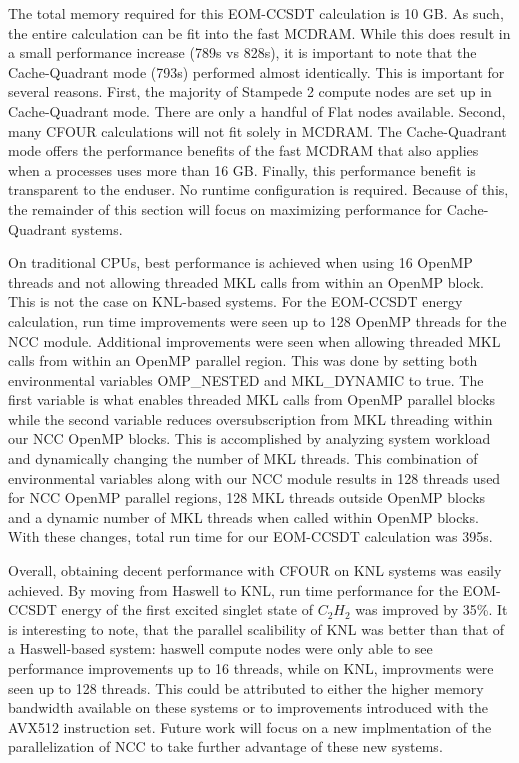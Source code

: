 The total memory required for this EOM-CCSDT calculation is 10 GB. As such, the entire calculation can
be fit into the fast MCDRAM. While this does result in a small performance increase (789s vs 828s), it is important
to note that the Cache-Quadrant mode (793s) performed almost identically. This is important for several reasons. First,
the majority of Stampede 2 compute nodes are set up in Cache-Quadrant mode. There are only a handful of Flat nodes
available. Second, many CFOUR calculations will not fit solely in MCDRAM. The Cache-Quadrant mode offers the 
performance benefits of the fast MCDRAM that also applies when a processes uses more than 16 GB. Finally, this
performance benefit is transparent to the enduser. No runtime configuration is required. Because of this, the 
remainder of this section will focus on maximizing performance for Cache-Quadrant systems.

On traditional CPUs, best performance is achieved when using 16 OpenMP threads and not allowing threaded MKL calls
from within an OpenMP block. This is not the case on KNL-based systems. For the EOM-CCSDT energy calculation, 
run time improvements were seen up to 128 OpenMP threads for the NCC module. Additional improvements were seen
when allowing threaded MKL calls from within an OpenMP parallel region. This was done by setting both environmental
variables OMP\_NESTED and MKL\_DYNAMIC to true. The first variable is what enables threaded MKL calls from OpenMP
parallel blocks while the second variable reduces oversubscription from MKL threading within our NCC OpenMP blocks.
This is accomplished by analyzing system workload and dynamically changing the number of MKL threads. This 
combination of environmental variables along with our NCC module results in 128 threads used for NCC OpenMP parallel
regions, 128 MKL threads outside OpenMP blocks and a dynamic number of MKL threads when called within OpenMP blocks.
With these changes, total run time for our EOM-CCSDT calculation was 395s.

Overall, obtaining decent performance with CFOUR on KNL systems was easily achieved. By moving from Haswell to 
KNL, run time performance for the EOM-CCSDT energy of the first excited singlet state of $C_2H_2$ was improved
by 35\%. It is interesting to note, that the parallel scalibility of KNL was better than that of a Haswell-based
system: haswell compute nodes were only able to see performance improvements up to 16 threads, while on KNL,
improvments were seen up to 128 threads. This could be attributed to either the higher memory bandwidth available
on these systems or to improvements introduced with the AVX512 instruction set. Future work will focus on a new
implmentation of the parallelization of NCC to take further advantage of these new systems.

